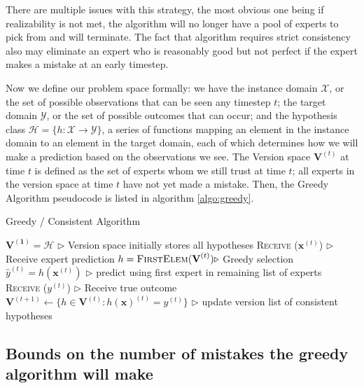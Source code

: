 \documentclass[11pt]{article}
\newcommand\X{\mathcal{X}}
\newcommand\Y{\mathcal{Y}}
\newcommand\HH{\mathcal{H}}
\begin{document}
There are multiple issues with this strategy, the most obvious one being if realizability is not met, the algorithm will no longer have a pool of experts to pick from and will terminate. The fact that algorithm requires strict consistency also may eliminate an expert who is reasonably good but not perfect if the expert makes a mistake at an early timestep.

Now we define our problem space formally: we have the instance domain $\X$, or the set of possible observations that can be seen any timestep $t$; the target domain $\Y$, or the set of possible outcomes that can occur; and the hypothesis class $\HH = \{h: \X \rightarrow \Y \}$, a series of functions mapping an element in the instance domain to an element in the target domain, each of which determines how we will make a prediction based on the observations we see. The Version space $\mathbf{V}^{(t)}$ at time $t$ is defined as the set of experts whom we still trust at time $t$; all experts in the version space at time $t$ have not yet made a mistake. Then, the Greedy Algorithm pseudocode is listed in algorithm \ref{algo:greedy}.

\begin{algorithm}[H]
\caption{Greedy / Consistent Algorithm}
\label{algo:greedy}
\begin{algorithmic}[1]
\STATE $\mathbf{V^{(1)}} = \mathcal{H}$  \hfill $\triangleright$ Version space initially stores all hypotheses
\STATE \textsc{Receive} ($\textbf{x}^{(t)}$) \hfill $\triangleright$ Receive expert prediction
\STATE $h =\textsc{FirstElem}(\textbf{V}^{(t)}) \hfill \triangleright$ Greedy selection 
\STATE $\hat{y}^{(t)} = h(\mathbf{x}^{(t)})$ \hfill $\triangleright$ predict using first expert in remaining list of experts
\STATE \textsc{Receive} ($y^{(t)}$) \hfill $\triangleright$ Receive true outcome
\STATE $\mathbf{V}^{(t+1)}\leftarrow \{ h \in \mathbf{V}^{(t)} : h(\textbf{x})^{(t)}=y^{(t)} \}$ \hfill $\triangleright$ update version list of consistent hypotheses
\ENDFOR
\end{algorithmic}
\end{algorithm}

\subsection{Bounds on the number of mistakes the greedy algorithm will make}
\end{document}
